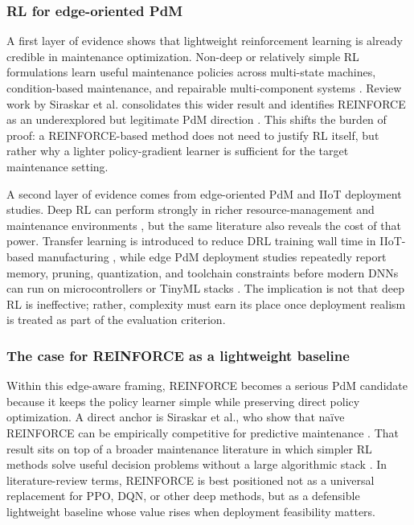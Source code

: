 \documentclass[refree,sn-basic]{sn-jnl} %
\begin{document}
\subsubsection{RL for edge-oriented PdM}
A first layer of evidence shows that lightweight reinforcement learning is already credible in maintenance optimization. Non-deep or relatively simple RL formulations learn useful maintenance policies across multi-state machines, condition-based maintenance, and repairable multi-component systems \cite{Wang2014, Adsule2020, Yousefi2020}. Review work by Siraskar et al. consolidates this wider result and identifies REINFORCE as an underexplored but legitimate PdM direction \cite{Siraskar2023}. This shifts the burden of proof: a REINFORCE-based method does not need to justify RL itself, but rather why a lighter policy-gradient learner is sufficient for the target maintenance setting.

A second layer of evidence comes from edge-oriented PdM and IIoT deployment studies. Deep RL can perform strongly in richer resource-management and maintenance environments \cite{Ong2022-01, Ong2022-02}, but the same literature also reveals the cost of that power. Transfer learning is introduced to reduce DRL training wall time in IIoT-based manufacturing \cite{Ong2022-02}, while edge PdM deployment studies repeatedly report memory, pruning, quantization, and toolchain constraints before modern DNNs can run on microcontrollers or TinyML stacks \cite{Pandey2023, Njor2024}. The implication is not that deep RL is ineffective; rather, complexity must earn its place once deployment realism is treated as part of the evaluation criterion.

\subsubsection{The case for REINFORCE as a lightweight baseline}
Within this edge-aware framing, REINFORCE becomes a serious PdM candidate because it keeps the policy learner simple while preserving direct policy optimization. A direct anchor is Siraskar et al., who show that na\"{i}ve REINFORCE can be empirically competitive for predictive maintenance \cite{Siraskar2025}. That result sits on top of a broader maintenance literature in which simpler RL methods solve useful decision problems without a large algorithmic stack \cite{Wang2014, Adsule2020, Yousefi2020}. In literature-review terms, REINFORCE is best positioned not as a universal replacement for PPO, DQN, or other deep methods, but as a defensible lightweight baseline whose value rises when deployment feasibility matters.
\end{document}
